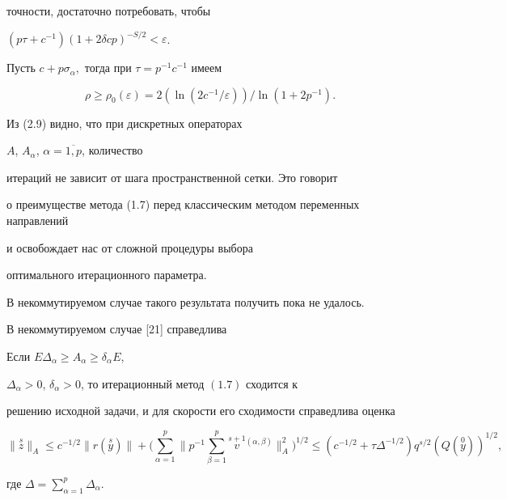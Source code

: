 точности, достаточно потребовать, чтобы


$(p\tau+c^{-1})(1+2\delta c p)^{-S/2}<\varepsilon$.


Пусть $c+p\sigma_\alpha,$ тогда при $\tau=p^{-1}c^{-1}$ имеем


\begin{equation}


\rho \ge \rho_0(\varepsilon)=2(\ln (2c^{-1}/\varepsilon))/\ln(1+2p^{-1}).


\end{equation}


Из (2.9) видно, что при дискретных операторах


$A$, $A_\alpha$, $\alpha=\overline {1,p}$, количество 


итераций не зависит от шага пространственной сетки. Это говорит


о преимуществе метода (1.7) перед классическим методом переменных направлений 


и освобождает нас от сложной процедуры выбора 


оптимального итерационного параметра.





В некоммутируемом случае такого результата получить пока не удалось.


В некоммутируемом случае [21] справедлива





\begin{thms}


Если $E \Delta_\alpha \ge A_\alpha \ge \delta_\alpha E$,


$\Delta_\alpha>0$, $\delta_\alpha>0$, то итерационный метод $(1.7)$ сходится к 


решению исходной задачи, и для скорости его сходимости справедлива оценка


\begin{equation}


\|\overset {s}{z}\|_A \le c^{-1/2}\|r(\overset {s}{y})\|+


\bigg(\sum\limits_{\alpha=1}^p \bigg\|p^{-1}


\sum\limits_{\beta=1}^p \overset {s+1}{v}{}^{(\alpha,\beta)}


\bigg\|_A ^2\bigg)^{1/2}


\le (c^{-1/2}+\tau\Delta^{-1/2})q^{s/2}(Q(\overset {0}{y}))^{1/2},


\end{equation}


где $\Delta=\sum\limits_{\alpha=1}^p \Delta_\alpha$.


\end{thms}





